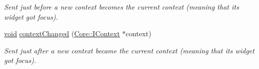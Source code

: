 \begin{DoxyCompactItemize}
\begin{DoxyCompactList}\small\item\em \-Sent just before a new {\itshape context\/} becomes the current context (meaning that its widget got focus). \end{DoxyCompactList}\item 
\hyperlink{group___u_a_v_objects_plugin_ga444cf2ff3f0ecbe028adce838d373f5c}{void} \hyperlink{group___core_plugin_ga61aa6225c352ac731243c640d281c56e}{context\-Changed} (\hyperlink{class_core_1_1_i_context}{\-Core\-::\-I\-Context} $\ast$context)
\begin{DoxyCompactList}\small\item\em \-Sent just after a new {\itshape context\/} became the current context (meaning that its widget got focus). \end{DoxyCompactList}\end{DoxyCompactItemize}
